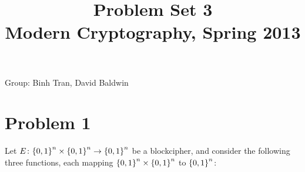 \documentclass[11pt]{article}
\title{\bf Problem Set 3 \\[2ex] 
       \rm\normalsize Modern Cryptography, Spring 2013}
\date{}
\author{}
\begin{document}
\maketitle


\vspace*{-1in}

\begin{center}{Group: Binh Tran, David Baldwin\\}
\end{center}

\section*{Problem 1}
Let $E \colon {\{0,1\}}^n \times {\{0,1\}}^n \to {\{0,1\}}^n$ be a blockcipher,
and consider the following three functions, each mapping ${\{0,1\}}^n
\times {\{0,1\}}^n$ to ${\{0,1\}}^n$:
\end{document}
